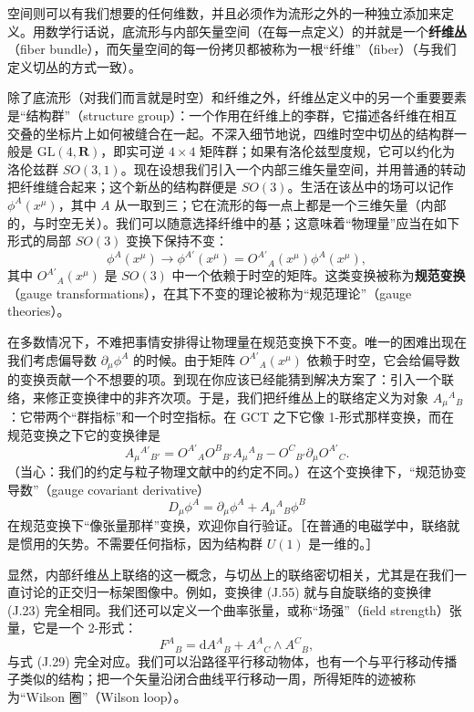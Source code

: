 空间则可以有我们想要的任何维数，并且必须作为流形之外的一种独立添加来定义。用数学行话说，底流形与内部矢量空间（在每一点定义）的并就是一个\textbf{纤维丛}（fiber bundle），而矢量空间的每一份拷贝都被称为一根“纤维”（fiber）（与我们定义切丛的方式一致）。

除了底流形（对我们而言就是时空）和纤维之外，纤维丛定义中的另一个重要要素是“结构群”（structure group）：一个作用在纤维上的李群，它描述各纤维在相互交叠的坐标片上如何被缝合在一起。不深入细节地说，四维时空中切丛的结构群一般是 $\mathrm{GL}(4,\mathbf{R})$，即实可逆 $4\times4$ 矩阵群；如果有洛伦兹型度规，它可以约化为洛伦兹群 $SO(3,1)$。现在设想我们引入一个内部三维矢量空间，并用普通的转动把纤维缝合起来；这个新丛的结构群便是 $SO(3)$。生活在该丛中的场可以记作 $\phi^{A}(x^{\mu})$，其中 $A$ 从一取到三；它在流形的每一点上都是一个三维矢量（内部的，与时空无关）。我们可以随意选择纤维中的基；这意味着“物理量”应当在如下形式的局部 $SO(3)$ 变换下保持不变：
\begin{equation*}
\phi^{A}(x^{\mu}) \to \phi^{A'}(x^{\mu}) = O^{A'}{}_{A}(x^{\mu})\phi^{A}(x^{\mu}),
\tag{J.54}
\end{equation*}
其中 $O^{A'}{}_{A}(x^{\mu})$ 是 $SO(3)$ 中一个依赖于时空的矩阵。这类变换被称为\textbf{规范变换}（gauge transformations），在其下不变的理论被称为“规范理论”（gauge theories）。

在多数情况下，不难把事情安排得让物理量在规范变换下不变。唯一的困难出现在我们考虑偏导数 $\partial_{\mu}\phi^{A}$ 的时候。由于矩阵 $O^{A'}{}_{A}(x^{\mu})$ 依赖于时空，它会给偏导数的变换贡献一个不想要的项。到现在你应该已经能猜到解决方案了：引入一个联络，来修正变换律中的非齐次项。于是，我们把纤维丛上的联络定义为对象 $A_{\mu}{}^{A}{}_{B}$：它带两个“群指标”和一个时空指标。在 GCT 之下它像 1-形式那样变换，而在规范变换之下它的变换律是
\begin{equation*}
A_{\mu}{}^{A'}{}_{B'} = O^{A'}{}_{A}O^{B}{}_{B'}A_{\mu}{}^{A}{}_{B} - O^{C}{}_{B'}\partial_{\mu}O^{A'}{}_{C}.
\tag{J.55}
\end{equation*}
（当心：我们的约定与粒子物理文献中的约定不同。）在这个变换律下，“规范协变导数”（gauge covariant derivative）
\begin{equation*}
D_{\mu}\phi^{A} = \partial_{\mu}\phi^{A} + A_{\mu}{}^{A}{}_{B}\phi^{B}
\tag{J.56}
\end{equation*}
在规范变换下“像张量那样”变换，欢迎你自行验证。［在普通的电磁学中，联络就是惯用的矢势。不需要任何指标，因为结构群 $U(1)$ 是一维的。］

显然，内部纤维丛上联络的这一概念，与切丛上的联络密切相关，尤其是在我们一直讨论的正交归一标架图像中。例如，变换律 (J.55) 就与自旋联络的变换律 (J.23) 完全相同。我们还可以定义一个曲率张量，或称“场强”（field strength）张量，它是一个 2-形式：
\begin{equation*}
F^{A}{}_{B} = \mathrm{d}A^{A}{}_{B} + A^{A}{}_{C}\wedge A^{C}{}_{B},
\tag{J.57}
\end{equation*}
与式 (J.29) 完全对应。我们可以沿路径平行移动物体，也有一个与平行移动传播子类似的结构；把一个矢量沿闭合曲线平行移动一周，所得矩阵的迹被称为“Wilson 圈”（Wilson loop）。


